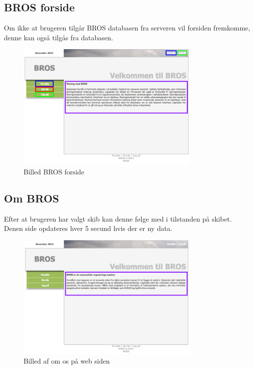 \subsection*{BROS forside}
Om ikke at brugeren tilgår BROS databasen fra serveren vil forsiden fremkomme, denne kan også tilgås fra databasen.
\begin{figure}[H]
	\centering
	\includegraphics[width=0.8\textwidth]{billeder/database/web_forside}
	\caption{Billed BROS forside}
	\label{fig:web_forside}
\end{figure}

\subsection*{Om BROS}
Efter at brugeren har valgt skib kan denne følge med i tilstanden på skibet. Denen side opdateres hver 5 secund hvis der er ny data.
\begin{figure}[H]
	\centering
	\includegraphics[width=0.8\textwidth]{billeder/database/web_about}
	\caption{Billed af om os på web siden}
	\label{fig:web_about}
\end{figure}


